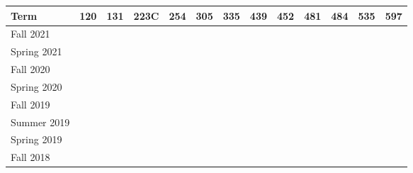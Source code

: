 \documentclass[11pt]{letter}
\newcommand{\ck}{\checkmark}
\begin{document}
  \begin{tabular}{|l|c|c|c|c|c|c|c|c|c|c|c|c|}
  \hline
  \textbf{Term} &
  \textbf{120} &
  \textbf{131} &
  \textbf{223C} &
  \textbf{254} &
  \textbf{305} &
  \textbf{335} &
  \textbf{439} &
  \textbf{452} &
  \textbf{481} &
  \textbf{484} &
  \textbf{535} &
  \textbf{597} \\ \hline

  Fall   2021 &    &\ck &    &    &    &    &    &    &    &    &\ck &    \\ \hline
  Spring 2021 &    &    &    &    &    &\ck &\ck &    &    &    &    &    \\ \hline
  Fall   2020 &    &\ck &    &    &    &    &    &    &    &    &\ck &    \\ \hline
  Spring 2020 &\ck &    &    &    &    &    &    &    &    &\ck &    &    \\ \hline
  Fall   2019 &\ck &    &    &    &    &    &    &    &    &    &\ck &    \\ \hline
  Summer 2019 &    &    &    &    &    &\ck &    &    &    &    &    &    \\ \hline
  Spring 2019 &    &    &    &    &    &\ck &    &    &    &\ck &\ck &    \\ \hline
  Fall   2018 &\ck &    &    &    &\ck &\ck &    &    &    &    &    &    \\ \hline

\end{tabular}
\end{document}
